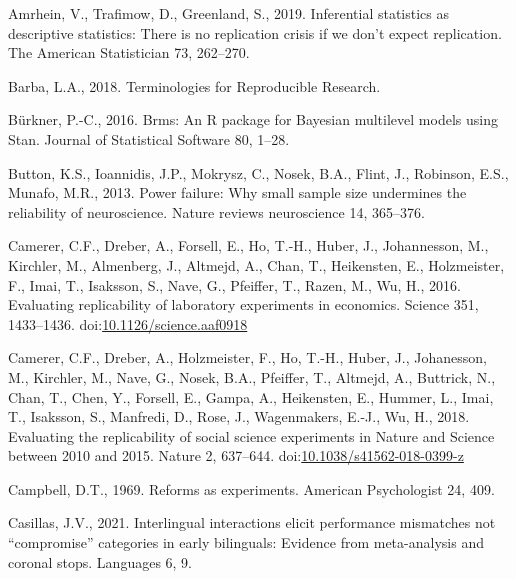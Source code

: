 \documentclass[]{elsarticle} %
\newlength{\cslhangindent}
\newlength{\cslentryspacingunit} %
\newenvironment{CSLReferences}[2] %
 {%
  \setlength{\parindent}{0pt}
  \ifodd #1
  \let\oldpar\par
  \def\par{\hangindent=\cslhangindent\oldpar}
  \fi
  \setlength{\parskip}{#2\cslentryspacingunit}
 }%
 {}
\begin{document}
\hypertarget{refs}{}
\begin{CSLReferences}{1}{0}
\leavevmode{}%
Amrhein, V., Trafimow, D., Greenland, S., 2019. Inferential statistics as descriptive statistics: There is no replication crisis if we don't expect replication. The American Statistician 73, 262--270.

\leavevmode{}%
Barba, L.A., 2018. Terminologies for {Reproducible} {Research}.

\leavevmode{}%
Bürkner, P.-C., 2016. Brms: {An} {R} package for {Bayesian} multilevel models using {Stan}. Journal of Statistical Software 80, 1--28.

\leavevmode{}%
Button, K.S., Ioannidis, J.P., Mokrysz, C., Nosek, B.A., Flint, J., Robinson, E.S., Munafo, M.R., 2013. Power failure: Why small sample size undermines the reliability of neuroscience. Nature reviews neuroscience 14, 365--376.

\leavevmode{}%
Camerer, C.F., Dreber, A., Forsell, E., Ho, T.-H., Huber, J., Johannesson, M., Kirchler, M., Almenberg, J., Altmejd, A., Chan, T., Heikensten, E., Holzmeister, F., Imai, T., Isaksson, S., Nave, G., Pfeiffer, T., Razen, M., Wu, H., 2016. Evaluating replicability of laboratory experiments in economics. Science 351, 1433--1436. doi:\href{https://doi.org/10.1126/science.aaf0918}{10.1126/science.aaf0918}

\leavevmode{}%
Camerer, C.F., Dreber, A., Holzmeister, F., Ho, T.-H., Huber, J., Johanesson, M., Kirchler, M., Nave, G., Nosek, B.A., Pfeiffer, T., Altmejd, A., Buttrick, N., Chan, T., Chen, Y., Forsell, E., Gampa, A., Heikensten, E., Hummer, L., Imai, T., Isaksson, S., Manfredi, D., Rose, J., Wagenmakers, E.-J., Wu, H., 2018. Evaluating the replicability of social science experiments in {Nature} and {Science} between 2010 and 2015. Nature 2, 637--644. doi:\href{https://doi.org/10.1038/s41562-018-0399-z}{10.1038/s41562-018-0399-z}

\leavevmode{}%
Campbell, D.T., 1969. Reforms as experiments. American Psychologist 24, 409.

\leavevmode{}%
Casillas, J.V., 2021. Interlingual interactions elicit performance mismatches not {``compromise''} categories in early bilinguals: Evidence from meta-analysis and coronal stops. Languages 6, 9.


\end{CSLReferences}
\end{document}
